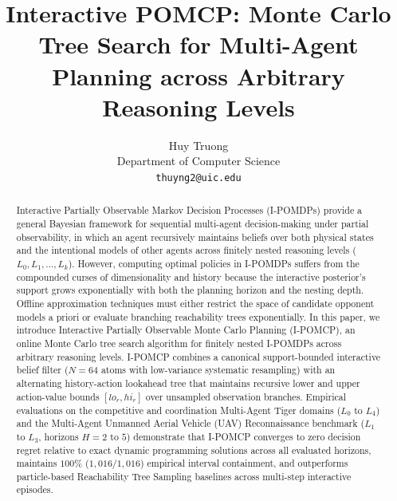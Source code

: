 \renewcommand{\thealgocf}{\arabic{algocf}}

\newcommand{\E}{\mathbb{E}}
\newcommand{\R}{\mathbb{R}}
\newcommand{\IS}{\mathit{IS}}
\newcommand{\btheta}{\boldsymbol{\theta}}

\newcommand{\diagbox}[4]{%
  \fcolorbox{#1}{#2}{%
    \parbox[c]{#3}{\centering\footnotesize #4}%
  }%
}

\title{Interactive POMCP: Monte Carlo Tree Search for Multi-Agent Planning across Arbitrary Reasoning Levels}

\author{%
  Huy Truong \\
  Department of Computer Science \\
  \texttt{thuyng2@uic.edu} \\
}



\maketitle

\begin{abstract}
Interactive Partially Observable Markov Decision Processes (I-POMDPs) provide a general Bayesian framework for sequential multi-agent decision-making under partial observability, in which an agent recursively maintains beliefs over both physical states and the intentional models of other agents across finitely nested reasoning levels ($L_0, L_1, \dots, L_k$). However, computing optimal policies in I-POMDPs suffers from the compounded curses of dimensionality and history because the interactive posterior's support grows exponentially with both the planning horizon and the nesting depth. Offline approximation techniques must either restrict the space of candidate opponent models a priori or evaluate branching reachability trees exponentially. In this paper, we introduce Interactive Partially Observable Monte Carlo Planning (I-POMCP), an online Monte Carlo tree search algorithm for finitely nested I-POMDPs across arbitrary reasoning levels. I-POMCP combines a canonical support-bounded interactive belief filter ($N=64$ atoms with low-variance systematic resampling) with an alternating history-action lookahead tree that maintains recursive lower and upper action-value bounds $[lo_r, hi_r]$ over unsampled observation branches. Empirical evaluations on the competitive and coordination Multi-Agent Tiger domains ($L_0$ to $L_4$) and the Multi-Agent Unmanned Aerial Vehicle (UAV) Reconnaissance benchmark ($L_1$ to $L_3$, horizons $H=2$ to $5$) demonstrate that I-POMCP converges to zero decision regret relative to exact dynamic programming solutions across all evaluated horizons, maintains $100\%$ ($1{,}016/1{,}016$) empirical interval containment, and outperforms particle-based Reachability Tree Sampling baselines across multi-step interactive episodes.
\end{abstract}


